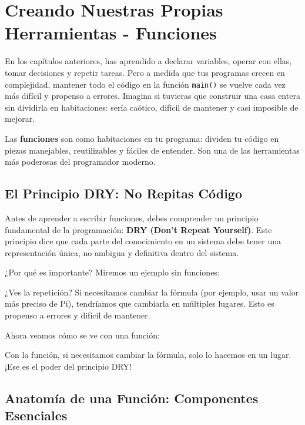 \section{Creando Nuestras Propias Herramientas - Funciones}
\label{sec:funciones}

En los capítulos anteriores, has aprendido a declarar variables, operar con ellas, tomar decisiones y repetir tareas. Pero a medida que tus programas crecen en complejidad, mantener todo el código en la función \texttt{main()} se vuelve cada vez más difícil y propenso a errores. Imagina si tuvieras que construir una casa entera sin dividirla en habitaciones: sería caótico, difícil de mantener y casi imposible de mejorar.

Las \textbf{funciones} son como habitaciones en tu programa: dividen tu código en piezas manejables, reutilizables y fáciles de entender. Son una de las herramientas más poderosas del programador moderno.

\subsection{El Principio DRY: No Repitas Código}
\label{subsec:principio_dry}

Antes de aprender a escribir funciones, debes comprender un principio fundamental de la programación: \textbf{DRY (Don't Repeat Yourself)}. Este principio dice que cada parte del conocimiento en un sistema debe tener una representación única, no ambigua y definitiva dentro del sistema.

¿Por qué es importante? Miremos un ejemplo sin funciones:



¿Ves la repetición? Si necesitamos cambiar la fórmula (por ejemplo, usar un valor más preciso de Pi), tendríamos que cambiarla en múltiples lugares. Esto es propenso a errores y difícil de mantener.

Ahora veamos cómo se ve con una función:



Con la función, si necesitamos cambiar la fórmula, solo lo hacemos en un lugar. ¡Ese es el poder del principio DRY!

\subsection{Anatomía de una Función: Componentes Esenciales}
\label{subsec:anatomia_funcion}

